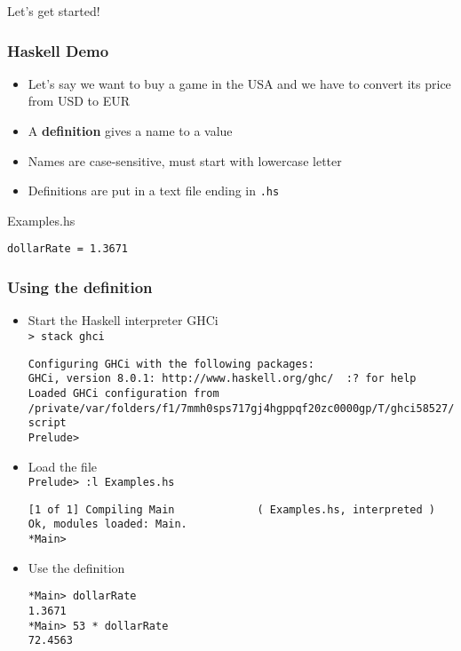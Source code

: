 \documentclass{beamer}
\subtitle{Starting Haskell}
\begin{document}
\begin{frame}
  \titlepage
\end{frame}

\begin{frame}
  \begin{Huge}
    \begin{center}
      Let's get started!
    \end{center}
  \end{Huge}
\end{frame}


\begin{frame}[fragile]
  \frametitle{Haskell Demo}
  \begin{itemize}
  \item  Let's say we want to buy a game in the USA and we have to
    convert its price from USD to EUR
  \item  A \textbf{definition} gives a name to a value
  \item Names are  case-sensitive, must start with lowercase letter
  \item Definitions are  put in a text file ending in \texttt{.hs}
  \end{itemize}
  \begin{block}{Examples.hs}
\begin{verbatim}
dollarRate = 1.3671
\end{verbatim}
  \end{block}
\end{frame}
\begin{frame}[fragile]
  \frametitle{Using the definition}
  \begin{itemize}
  \item Start the Haskell interpreter  GHCi\\
    \texttt{> stack ghci}
\begin{verbatim}
Configuring GHCi with the following packages: 
GHCi, version 8.0.1: http://www.haskell.org/ghc/  :? for help
Loaded GHCi configuration from /private/var/folders/f1/7mmh0sps717gj4hgppqf20zc0000gp/T/ghci58527/ghci-script
Prelude> 
\end{verbatim}
  \item Load the file\\
    \texttt{Prelude> :l Examples.hs}
\begin{verbatim}
[1 of 1] Compiling Main             ( Examples.hs, interpreted )
Ok, modules loaded: Main.
*Main> 
\end{verbatim}
  \item Use the definition
\begin{verbatim}
*Main> dollarRate
1.3671
*Main> 53 * dollarRate
72.4563
\end{verbatim}
  \end{itemize}
\end{frame}
\end{document}
